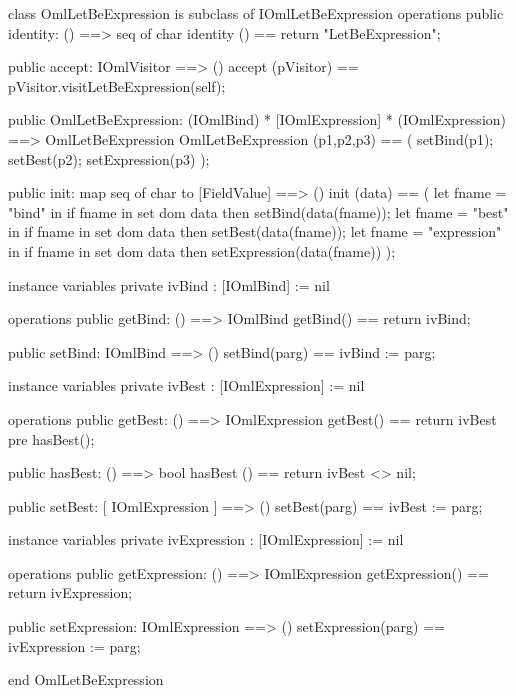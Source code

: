 \begin{vdm_al}
class OmlLetBeExpression is subclass of IOmlLetBeExpression
operations
  public identity: () ==> seq of char
  identity () == return "LetBeExpression";

  public accept: IOmlVisitor ==> ()
  accept (pVisitor) == pVisitor.visitLetBeExpression(self);

  public OmlLetBeExpression:
      (IOmlBind) *
      [IOmlExpression] *
      (IOmlExpression) ==> OmlLetBeExpression
  OmlLetBeExpression (p1,p2,p3) == 
   ( setBind(p1);
     setBest(p2);
     setExpression(p3) );

  public init: map seq of char to [FieldValue] ==> ()
  init (data) ==
    ( let fname = "bind" in
        if fname in set dom data
        then setBind(data(fname));
      let fname = "best" in
        if fname in set dom data
        then setBest(data(fname));
      let fname = "expression" in
        if fname in set dom data
        then setExpression(data(fname)) );

instance variables
  private ivBind : [IOmlBind] := nil

operations
  public getBind: () ==> IOmlBind
  getBind() == return ivBind;

  public setBind: IOmlBind ==> ()
  setBind(parg) == ivBind := parg;

instance variables
  private ivBest : [IOmlExpression] := nil

operations
  public getBest: () ==> IOmlExpression
  getBest() == return ivBest
    pre hasBest();

  public hasBest: () ==> bool
  hasBest () == return ivBest <> nil;

  public setBest: [ IOmlExpression ] ==> ()
  setBest(parg) == ivBest := parg;

instance variables
  private ivExpression : [IOmlExpression] := nil

operations
  public getExpression: () ==> IOmlExpression
  getExpression() == return ivExpression;

  public setExpression: IOmlExpression ==> ()
  setExpression(parg) == ivExpression := parg;

end OmlLetBeExpression
\end{vdm_al}

